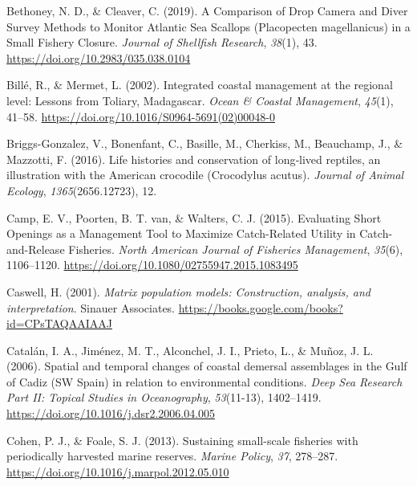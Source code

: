 \documentclass[
]{article}
\newlength{\cslhangindent}
\newlength{\cslentryspacingunit} %
\newenvironment{CSLReferences}[2] %
 {%
  \setlength{\parindent}{0pt}
  \ifodd #1
  \let\oldpar\par
  \def\par{\hangindent=\cslhangindent\oldpar}
  \fi
  \setlength{\parskip}{#2\cslentryspacingunit}
 }%
 {}
\begin{document}
\begin{CSLReferences}{1}{2}
\leavevmode{}%
Bethoney, N. D., \& Cleaver, C. (2019). A {Comparison} of {Drop} {Camera} and {Diver} {Survey} {Methods} to {Monitor} {Atlantic} {Sea} {Scallops} ({Placopecten} magellanicus) in a {Small} {Fishery} {Closure}. \emph{Journal of Shellfish Research}, \emph{38}(1), 43. \url{https://doi.org/10.2983/035.038.0104}

\leavevmode{}%
Billé, R., \& Mermet, L. (2002). Integrated coastal management at the regional level: Lessons from {Toliary}, {Madagascar}. \emph{Ocean \& Coastal Management}, \emph{45}(1), 41--58. \url{https://doi.org/10.1016/S0964-5691(02)00048-0}

\leavevmode{}%
Briggs-Gonzalez, V., Bonenfant, C., Basille, M., Cherkiss, M., Beauchamp, J., \& Mazzotti, F. (2016). Life histories and conservation of long‐lived reptiles, an illustration with the {American} crocodile ({Crocodylus} acutus). \emph{Journal of Animal Ecology}, \emph{1365}(2656.12723), 12.

\leavevmode{}%
Camp, E. V., Poorten, B. T. van, \& Walters, C. J. (2015). Evaluating {Short} {Openings} as a {Management} {Tool} to {Maximize} {Catch}-{Related} {Utility} in {Catch}-and-{Release} {Fisheries}. \emph{North American Journal of Fisheries Management}, \emph{35}(6), 1106--1120. \url{https://doi.org/10.1080/02755947.2015.1083495}

\leavevmode{}%
Caswell, H. (2001). \emph{Matrix population models: {Construction}, analysis, and interpretation}. Sinauer Associates. \url{https://books.google.com/books?id=CPsTAQAAIAAJ}

\leavevmode{}%
Catalán, I. A., Jiménez, M. T., Alconchel, J. I., Prieto, L., \& Muñoz, J. L. (2006). Spatial and temporal changes of coastal demersal assemblages in the {Gulf} of {Cadiz} ({SW} {Spain}) in relation to environmental conditions. \emph{Deep Sea Research Part II: Topical Studies in Oceanography}, \emph{53}(11-13), 1402--1419. \url{https://doi.org/10.1016/j.dsr2.2006.04.005}

\leavevmode{}%
Cohen, P. J., \& Foale, S. J. (2013). Sustaining small-scale fisheries with periodically harvested marine reserves. \emph{Marine Policy}, \emph{37}, 278--287. \url{https://doi.org/10.1016/j.marpol.2012.05.010}


\end{CSLReferences}
\end{document}

